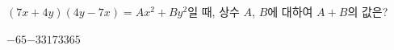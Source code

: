 $(7x+4y)(4y-7x)=Ax^2+By^2$일 때, 상수 $A$, $B$에 대하여 $A+B$의 값은?
\begin{choices32}{$-65$}{$-33$}{$17$}{$33$}{$65$}\end{choices32}
